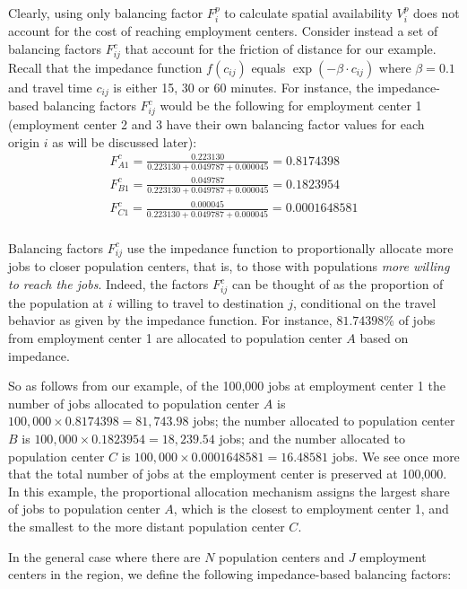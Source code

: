 \documentclass[10pt,letterpaper]{article}
\begin{document}
Clearly, using only balancing factor \(F^p_{i}\) to calculate spatial
availability \(V^p_i\) does not account for the cost of reaching
employment centers. Consider instead a set of balancing factors
\(F^c_{ij}\) that account for the friction of distance for our example.
Recall that the impedance function \(f(c_{ij})\) equals
\(\exp(-\beta\cdot c_{ij})\) where \(\beta = 0.1\) and travel time
\(c_{ij}\) is either 15, 30 or 60 minutes. For instance, the
impedance-based balancing factors \(F^c_{ij}\) would be the following
for employment center 1 (employment center 2 and 3 have their own
balancing factor values for each origin \(i\) as will be discussed
later): \[
\begin{array}{l}
F^c_{A1} = \frac{0.223130}{0.223130 + 0.049787 + 0.000045} = 0.8174398\\
F^c_{B1} = \frac{0.049787}{0.223130 + 0.049787 + 0.000045} = 0.1823954\\
F^c_{C1} = \frac{0.000045}{0.223130 + 0.049787 + 0.000045} = 0.0001648581\\
\end{array}
\]

Balancing factors \(F^c_{ij}\) use the impedance function to
proportionally allocate more jobs to closer population centers, that is,
to those with populations \emph{more willing to reach the jobs}. Indeed,
the factors \(F^c_{ij}\) can be thought of as the proportion of the
population at \(i\) willing to travel to destination \(j\), conditional
on the travel behavior as given by the impedance function. For instance,
\({81.74398}\%\) of jobs from employment center 1 are allocated to
population center \(A\) based on impedance.

So as follows from our example, of the 100,000 jobs at employment center
1 the number of jobs allocated to population center \(A\) is
\(100,000\times 0.8174398 = 81,743.98\) jobs; the number allocated to
population center \(B\) is \(100,000\times 0.1823954 = 18,239.54\) jobs;
and the number allocated to population center \(C\) is
\(100,000\times 0.0001648581 = 16.48581\) jobs. We see once more that
the total number of jobs at the employment center is preserved at
100,000. In this example, the proportional allocation mechanism assigns
the largest share of jobs to population center \(A\), which is the
closest to employment center 1, and the smallest to the more distant
population center \(C\).

In the general case where there are \(N\) population centers and \(J\)
employment centers in the region, we define the following
impedance-based balancing factors:
\end{document}
